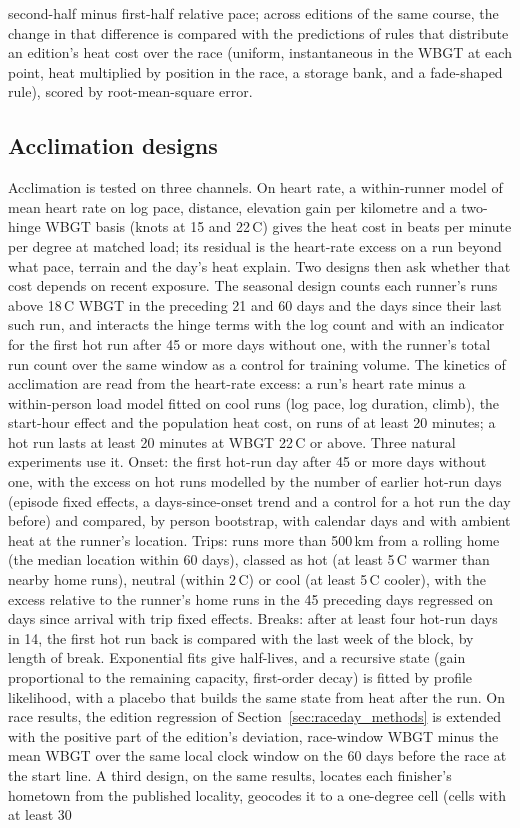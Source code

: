 \documentclass[11pt]{article}
\renewcommand{\_}{\textunderscore\allowbreak}
\begin{document}
second-half minus first-half relative pace; across editions of the same course, the change in that difference is compared with the predictions of rules that distribute an edition's heat cost over the race (uniform, instantaneous in the WBGT at each point, heat multiplied by position in the race, a storage bank, and a fade-shaped rule), scored by root-mean-square error.

\subsection{Acclimation designs}
\label{sec:accl_methods}

Acclimation is tested on three channels. On heart rate, a within-runner model of mean heart rate on log pace, distance, elevation gain per kilometre and a two-hinge WBGT basis (knots at 15 and 22\,\textdegree C) gives the heat cost in beats per minute per degree at matched load; its residual is the heart-rate excess on a run beyond what pace, terrain and the day's heat explain. Two designs then ask whether that cost depends on recent exposure. The seasonal design counts each runner's runs above 18\,\textdegree C WBGT in the preceding 21 and 60 days and the days since their last such run, and interacts the hinge terms with the log count and with an indicator for the first hot run after 45 or more days without one, with the runner's total run count over the same window as a control for training volume. The kinetics of acclimation are read from the heart-rate excess: a run's heart rate minus a within-person load model fitted on cool runs (log pace, log duration, climb), the start-hour effect and the population heat cost, on runs of at least 20 minutes; a hot run lasts at least 20 minutes at WBGT 22\,\textdegree C or above. Three natural experiments use it. Onset: the first hot-run day after 45 or more days without one, with the excess on hot runs modelled by the number of earlier hot-run days (episode fixed effects, a days-since-onset trend and a control for a hot run the day before) and compared, by person bootstrap, with calendar days and with ambient heat at the runner's location. Trips: runs more than 500\,km from a rolling home (the median location within 60 days), classed as hot (at least 5\,\textdegree C warmer than nearby home runs), neutral (within 2\,\textdegree C) or cool (at least 5\,\textdegree C cooler), with the excess relative to the runner's home runs in the 45 preceding days regressed on days since arrival with trip fixed effects. Breaks: after at least four hot-run days in 14, the first hot run back is compared with the last week of the block, by length of break. Exponential fits give half-lives, and a recursive state (gain proportional to the remaining capacity, first-order decay) is fitted by profile likelihood, with a placebo that builds the same state from heat after the run. On race results, the edition regression of Section~\ref{sec:raceday_methods} is extended with the positive part of the edition's deviation, race-window WBGT minus the mean WBGT over the same local clock window on the 60 days before the race at the start line. A third design, on the same results, locates each finisher's hometown from the published locality, geocodes it to a one-degree cell (cells with at least 30 
\end{document}
